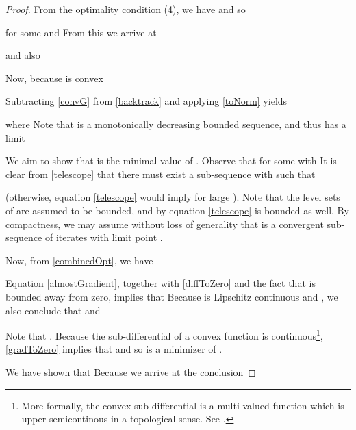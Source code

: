\documentclass{amsart}
\newcommand{\eqn}[2]{}
\newcommand{\aln}[1]{}
\newcommand{\ra}{\rangle}
\newcommand{\la}{\langle}
\newcommand{\kp}{^{k+1}}
\theoremstyle{definition}
\begin{document}
\begin{proof}

  From the optimality condition (4), we have  and so
  
  for some  and   From this we arrive at
  \aln{ \label{combinedOpt}
  x^k-x\kp = \tau^k (G\kp+F^k)
  }  
  and also
  \eqn{toNorm}{
   \la x\kp-x^k, F^k+G\kp \ra = - \frac{1}{\tau^k}\|x\kp-x^k\|^2.
   }
  
  Now, because  is convex
  \aln{\label{convG}
    g(x^k) \ge g(x\kp)+\la x^k-x\kp, G\kp  \ra.
  }
  Subtracting \eqref{convG} from \eqref{backtrack} and applying \eqref{toNorm} yields
\aln{ \label{telescope} 
 h(x\kp) =& \, f(x\kp)+g(x\kp)  \notag
 \\ \le & \, \hat f^k+ g(x^k) + \la x\kp-x^k, F^k+G\kp \ra \notag \\ 
                  & +\frac{1}{2\tau^k}\|x\kp-x^k\|^2 \notag \\
     = & \,  \hat f^k+ g(x^k)-\frac{1}{2\tau^k}\|x\kp-x^k\|^2\notag \\
      = &  \, \hat h^k-\frac{1}{2\tau^k}\|x\kp-x^k\|^2 .
  }
  where   Note that  is a monotonically decreasing bounded sequence, and thus has a limit   
  
  We aim to show that   is the minimal value of  .   Observe that  for some  with     It is clear from \eqref{telescope} that there must exist a sub-sequence   with  such that 
  \aln{ \label{diffToZero}
  \lim_{i\to\infty} \frac{1}{2\tau^k}\|x^{k(i)+1} -x^{k(i)} \|^2=0
  }
   (otherwise, equation \eqref{telescope} would imply  for large ).  Note that  the level sets of  are assumed to be bounded, and by equation \eqref{telescope}  is bounded as well.  By compactness,  we may assume without loss of generality that  is a convergent sub-sequence of iterates with limit point .  
   
   Now, from  \eqref{combinedOpt}, we have 
   \aln{ \label{almostGradient}
    \frac{1}{2\tau^k} \|x^{k(i)+1} -x^{k(i)} \|^2 = \frac{\tau^k}{2} \| G^{k(i)+1} +F^{k(i)} \|^2 .
    }
   Equation \eqref{almostGradient}, together with  \eqref{diffToZero} and the fact that  is bounded away from zero, implies that
        Because  is Lipschitz continuous and , we also conclude that   and
        \aln{ \label{gradToZero}
        \lim_{i\to\infty} \| G^{k(i)+1} +F^{k(i+1)} \|^2 =0. 
        }
  Note that .   Because the sub-differential of a convex function is continuous\footnote{More formally, the convex  sub-differential is a multi-valued function which is upper semicontinous in a topological sense. See \cite{CSZ07,BC11}.  },  \eqref{gradToZero} implies that  and so   is a minimizer of .
  
    We have shown that  Because  we arrive at the conclusion 
     
    
    \end{proof}




\end{document}
